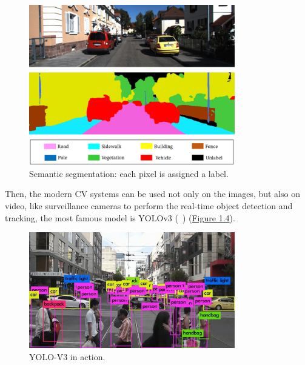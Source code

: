 \begin{figure}[H]
    \centering
    \includegraphics[width=0.8\textwidth]{images/1_1_semantic_segmentation}
    \caption[Example of semantic segmentation]{Semantic segmentation: each pixel is assigned a label.}
    \label{fig:figure-semantic-segmentation}
\end{figure}

Then, the modern CV systems can be used not only on the images, but also on video, like surveillance cameras to perform the real-time object detection and tracking, the most famous model is YOLOv3 (~\cite{yolov3_paper}) (\hyperref[fig:figure-yolo-v3]{Figure 1.4}).

\begin{figure}[H]
    \centering
    \includegraphics[width=0.8\textwidth]{images/1_1_yolov3}
    \caption{YOLO-V3 in action.}
    \label{fig:figure-yolo-v3}
\end{figure}

